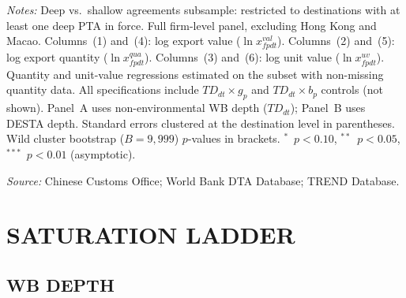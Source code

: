 \documentclass{article}
\begin{document}
\begin{table}[htbp]
\begin{threeparttable}
\begin{tabular}{lcccccc}
\bottomrule
\end{tabular}
\begin{tablenotes}[flushleft]\footnotesize
\item \textit{Notes:} Deep vs.\ shallow agreements subsample: restricted to destinations with at least one deep PTA in force. Full firm-level panel, excluding Hong Kong and Macao. Columns~(1) and~(4): log export value ($\ln x^{val}_{fpdt}$). Columns~(2) and~(5): log export quantity ($\ln x^{qua}_{fpdt}$). Columns~(3) and~(6): log unit value ($\ln x^{uv}_{fpdt}$). Quantity and unit-value regressions estimated on the subset with non-missing quantity data. All specifications include $TD_{dt} \times g_p$ and $TD_{dt} \times b_p$ controls (not shown). Panel~A uses non-environmental WB depth ($TD_{dt}$); Panel~B uses DESTA depth. Standard errors clustered at the destination level in parentheses. Wild cluster bootstrap ($B = 9{,}999$) $p$-values in brackets. $^{*}$~$p<0.10$, $^{**}$~$p<0.05$, $^{***}$~$p<0.01$ (asymptotic).
\item \textit{Source:} Chinese Customs Office; World Bank DTA Database; TREND Database.
\end{tablenotes}
\end{threeparttable}
\end{table}


\newpage
\section{SATURATION LADDER}

\subsection{WB DEPTH}
\end{document}
